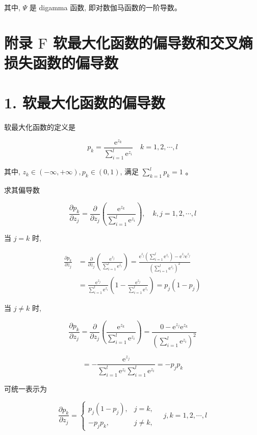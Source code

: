 \documentclass[10pt]{article}
\begin{document}
其中, $\Psi$ 是 digamma 函数, 即对数伽马函数的一阶导数。

\section*{附录 $\mathrm{F}$ 软最大化函数的偏导数和交叉熵损失函数的偏导数}
\section*{1. 软最大化函数的偏导数}
软最大化函数的定义是


\begin{equation*}
p_{k}=\frac{\mathrm{e}^{z_{k}}}{\sum_{i=1}^{l} \mathrm{e}^{z_{i}}} \quad k=1,2, \cdots, l \tag{F.1}
\end{equation*}


其中, $z_{k} \in(-\infty,+\infty), p_{k} \in(0,1)$, 满足 $\sum_{k=1}^{l} p_{k}=1$ 。

求其偏导数

$$
\frac{\partial p_{k}}{\partial z_{j}}=\frac{\partial}{\partial z_{j}}\left(\frac{\mathrm{e}^{z_{k}}}{\sum_{i=1}^{l} \mathrm{e}^{z_{i}}}\right), \quad k, j=1,2, \cdots, l
$$

当 $j=k$ 时,

$$
\begin{aligned}
\frac{\partial p_{k}}{\partial z_{j}} & =\frac{\partial}{\partial z_{j}}\left(\frac{\mathrm{e}^{z_{j}}}{\sum_{i=1}^{l} \mathrm{e}^{z_{i}}}\right)=\frac{\mathrm{e}^{z_{j}}\left(\sum_{i=1}^{l} \mathrm{e}^{z_{i}}\right)-\mathrm{e}^{z_{j}} \mathrm{e}^{z_{j}}}{\left(\sum_{i=1}^{l} \mathrm{e}^{z_{i}}\right)^{2}} \\
& =\frac{\mathrm{e}^{z_{j}}}{\sum_{i=1}^{l} \mathrm{e}^{z_{i}}}\left(1-\frac{\mathrm{e}^{z_{j}}}{\sum_{i=1}^{l} \mathrm{e}^{z_{i}}}\right)=p_{j}\left(1-p_{j}\right)
\end{aligned}
$$

当 $j \neq k$ 时,

$$
\frac{\partial p_{k}}{\partial z_{j}}=\frac{\partial}{\partial z_{j}}\left(\frac{\mathrm{e}^{z_{k}}}{\sum_{i=1}^{l} \mathrm{e}^{z_{i}}}\right)=\frac{0-\mathrm{e}^{z_{j}} \mathrm{e}^{z_{k}}}{\left(\sum_{i=1}^{l} \mathrm{e}^{z_{i}}\right)^{2}}
$$

$$
=-\frac{\mathrm{e}^{z_{j}}}{\sum_{i=1}^{l} \mathrm{e}^{z_{i}} \sum_{i=1}^{l} \mathrm{e}^{z_{i}}}=-p_{j} p_{k}
$$

可统一表示为

\[
\frac{\partial p_{k}}{\partial z_{j}}=\left\{\begin{array}{ll}
p_{j}\left(1-p_{j}\right), & j=k,  \tag{F.2}\\
-p_{j} p_{k}, & j \neq k,
\end{array} \quad j, k=1,2, \cdots, l\right.
\]
\end{document}
